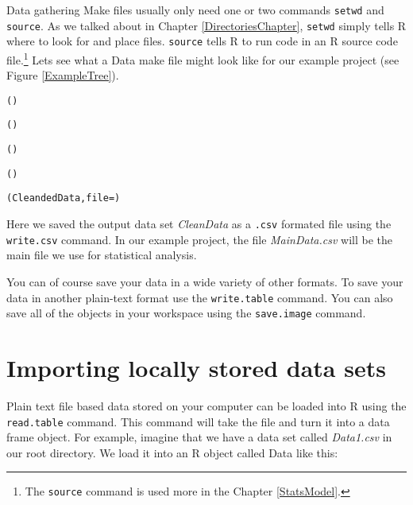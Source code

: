 Data gathering Make files usually only need one or two commands {\tt{setwd}} and {\tt{source}}. As we talked about in Chapter \ref{DirectoriesChapter}, {\tt{setwd}} simply tells R where to look for and place files. {\tt{source}} tells R to run code in an R source code file.\footnote{The {\tt{source}} command is used more in the Chapter \ref{StatsModel}.}  Lets see what a Data make file might look like for our example project (see Figure \ref{ExampleTree}).

\begin{knitrout}
\color{fgcolor}\begin{kframe}
\begin{alltt}
()

()

()

()

(CleandedData, file = )
\end{alltt}
\end{kframe}
\end{knitrout}


Here we saved the output data set {\emph{CleanData}} as a \texttt{.csv} formated file using the {\tt{write.csv}} command. In our example project, the file {\emph{MainData.csv}} will be the main file we use for statistical analysis. 

You can of course save your data in a wide variety of other formats. To save your data in another plain-text format use the \texttt{write.table} command. You can also save all of the objects in your workspace using the \texttt{save.image} command.

\section{Importing locally stored data sets}

Plain text file based data stored on your computer can be loaded into R using the \texttt{read.table} command. This command will take the file and turn it into a data frame object. For example, imagine that we have a data set called {\emph{Data1.csv}} in our root directory. We load it into an R object called Data like this:

